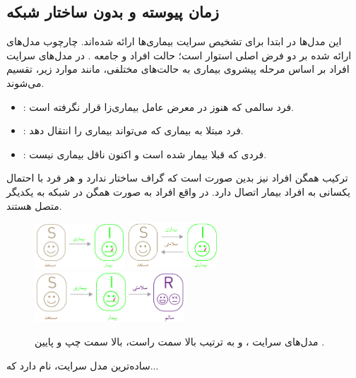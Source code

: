\subsection{زمان پیوسته و بدون ساختار شبکه}
این مدل‌ها در ابتدا برای تشخیص سرایت بیماری‌ها ارائه شده‌اند. چارچوب مدل‌های ارائه شده بر دو فرض اصلی استوار است؛ حالت
افراد و 
جامعه \cite{Barabasi2015}. در مدل‌های سرایت افراد بر اساس مرحله پیشروی بیماری به حالت‌های مختلفی، مانند موارد زیر، تقسیم می‌شوند.
\begin{itemize}
	\item {} :
	 فرد سالمی که هنوز در معرض عامل بیماری‌زا قرار نگرفته است.
	\item  {} : 
	فرد مبتلا به بیماری که  می‌تواند بیماری را انتقال دهد.
	\item  {} :
فردی که قبلا بیمار شده است و اکنون ناقل بیماری نیست.
\end{itemize}
ترکیب همگن افراد نیز بدین صورت است که گراف ساختار ندارد و هر فرد با احتمال یکسانی به افراد بیمار اتصال دارد. 
در واقع افراد به صورت همگن در شبکه به یکدیگر متصل هستند.
\begin{figure}
\center
\includegraphics[width=0.3\textwidth]{images/SI_model}
\hspace{7mm}
\includegraphics[width=0.3\textwidth]{images/SIS_model}\\
\includegraphics[width=0.5\textwidth]{images/SIR_model}
\caption{
مدل‌های سرایت ،  و  به ترتیب بالا سمت راست، بالا سمت چپ و پایین \cite{Barabasi2015}.
 }
\label{fig:epidemic-models}
\end{figure}
ساده‌ترین مدل سرایت،  نام دارد که...
